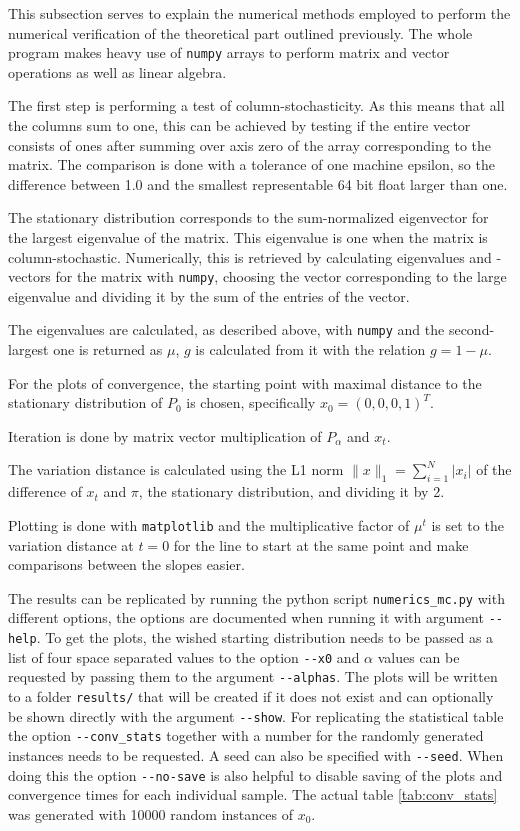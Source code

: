 This subsection serves to explain the numerical methods employed to perform the numerical verification of the theoretical part outlined previously.
The whole program makes heavy use of \texttt{numpy} arrays to perform matrix and vector operations as well as linear algebra.

The first step is performing a test of column-stochasticity.
As this means that all the columns sum to one, this can be achieved by testing if the entire vector consists of ones after summing over axis zero of the array corresponding to the matrix.
The comparison is done with a tolerance of one machine epsilon, so the difference between \num{1.0} and the smallest representable 64 bit float larger than one.

The stationary distribution corresponds to the sum-normalized eigenvector for the largest eigenvalue of the matrix.
This eigenvalue is one when the matrix is column-stochastic.
Numerically, this is retrieved by calculating eigenvalues and -vectors for the matrix with \texttt{numpy}, choosing the vector corresponding to the large eigenvalue and dividing it by the sum of the entries of the vector.

The eigenvalues are calculated, as described above, with \texttt{numpy} and the second-largest one is returned as $\mu$, $g$ is calculated from it with the relation $g=1-\mu$.

For the plots of convergence, the starting point with maximal distance to the stationary distribution of $P_0$ is chosen, specifically $x_0 = \left(0, 0, 0, 1\right)^T$.

Iteration is done by matrix vector multiplication of $P_\alpha$ and $x_t$.

The variation distance is calculated using the L1 norm $\|x\|_1=\sum_{i=1}^{N}|x_i|$ of the difference of $x_t$ and $\pi$, the stationary distribution, and dividing it by 2.

Plotting is done with \texttt{matplotlib} and the multiplicative factor of $\mu^t$ is set to the variation distance at $t=0$ for the line to start at the same point and make comparisons between the slopes easier.

The results can be replicated by running the python script \verb|numerics_mc.py| with different options, the options are documented when running it with argument \verb|--help|.
To get the plots, the wished starting distribution needs to be passed as a list of four space separated values to the option \verb|--x0| and $\alpha$ values can be requested by passing them to the argument \verb|--alphas|. The plots will be written to a folder \verb|results/| that will be created if it does not exist  and can optionally be shown directly with the argument \verb|--show|.
For replicating the statistical table the option \verb|--conv_stats| together with a number for the randomly generated instances needs to be requested.
A seed can also be specified with \verb|--seed|.
When doing this the option \verb|--no-save| is also helpful to disable saving of the plots and convergence times for each individual sample.
The actual table \ref{tab:conv_stats} was generated with 10000 random instances of $x_0$.